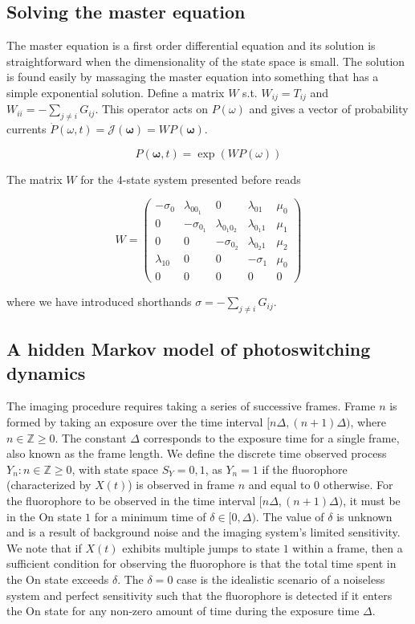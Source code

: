 \documentclass{ucetd}
\begin{document}
\subsection{Solving the master equation}

The master equation is a first order differential equation and its solution is straightforward when the dimensionality of the state space is small. The solution is found easily by massaging the master equation into something that has a simple exponential solution. Define a matrix $W$ s.t. $W_{ij} = T_{ij}$ and $W_{ii} = -\sum_{j\neq i}G_{ij}$. This operator acts on $P(\omega)$ and gives a vector of probability currents $\dot{P}(\omega,t) = \mathcal{J}(\bm{\omega}) = W P(\bm{\omega})$. 

\begin{equation*}
P(\bm{\omega}, t) = \exp(W P(\omega))
\end{equation*}

The matrix $W$ for the 4-state system presented before reads

\begin{equation*}
W = 
\begin{pmatrix}
-\sigma_{0} & \lambda_{0 0_{1}} & 0 & \lambda_{01} & \mu_{0}\\
0 & -\sigma_{0_{1}} & \lambda_{0_{1}0_{2}} & \lambda_{0_{1}1} & \mu_{1}\\
0 & 0 & -\sigma_{0_{2}} & \lambda_{0_{2}1} & \mu_{2}\\
\lambda_{10} & 0 & 0 & -\sigma_{1} & \mu_{0}\\
0 & 0 & 0 & 0 & 0
\end{pmatrix}
\end{equation*}

where we have introduced shorthands $\sigma = -\sum_{j\neq i}G_{ij}$.

\subsection{A hidden Markov model of photoswitching dynamics}

The imaging procedure requires taking a series of successive frames. Frame $n$ is formed by taking an exposure over the time interval $[n\Delta, (n+1)\Delta)$, where $n\in\mathbb{Z}{\geq0}$. The constant $\Delta$ corresponds to the exposure time for a single frame, also known as the frame length. We define the discrete time observed process ${Y_n: n \in \mathbb{Z}{\geq0}}$, with state space $S_Y={0,1}$, as $Y_n=1$ if the fluorophore (characterized by ${X(t)}$) is observed in frame $n$ and equal to $0$ otherwise. For the fluorophore to be observed in the time interval $[n\Delta, (n+1)\Delta)$, it must be in the On state $1$ for a minimum time of $\delta\in[0,\Delta)$. The value of $\delta$ is unknown and is a result of background noise and the imaging system's limited sensitivity. We note that if ${X(t)}$ exhibits multiple jumps to state $1$ within a frame, then a sufficient condition for observing the fluorophore is that the total time spent in the On state exceeds $\delta$. The $\delta=0$ case is the idealistic scenario of a noiseless system and perfect sensitivity such that the fluorophore is detected if it enters the On state for any non-zero amount of time during the exposure time $\Delta$.
\end{document}
